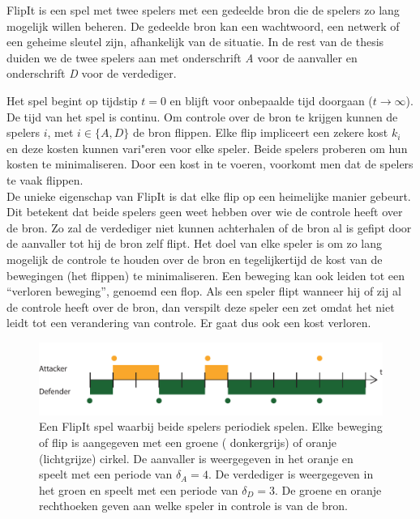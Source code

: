 \documentclass[master=cws, masteroption=vs,english]{kulemt}
\begin{document}
\begin{abstract*}
FlipIt is een spel met twee spelers met een gedeelde bron die de spelers zo lang mogelijk willen beheren. De gedeelde bron kan een wachtwoord, een netwerk of een geheime sleutel zijn, afhankelijk van de situatie. In de rest van de thesis duiden we de twee spelers aan met onderschrift  \textit{A} voor de aanvaller en onderschrift \textit{D} voor de verdediger.

Het spel begint op tijdstip $ t = 0 $ en blijft voor onbepaalde tijd doorgaan ($ t \rightarrow \infty $). De tijd van het spel is continu. Om controle over de bron te krijgen kunnen de spelers $i$, met $ i \in \{A, D \} $ de bron flippen. Elke flip impliceert een zekere kost $ k_{i} $ en deze kosten kunnen vari"eren voor elke speler. Beide spelers proberen om hun kosten te minimaliseren. Door een kost in te voeren, voorkomt men dat de spelers te vaak flippen. \\

De unieke eigenschap van FlipIt is dat elke flip op een heimelijke manier gebeurt. Dit betekent dat beide spelers geen weet hebben over wie de controle heeft over de bron. Zo zal de verdediger niet kunnen achterhalen of de bron al is gefipt door de aanvaller tot hij de bron zelf flipt. Het doel van elke speler is om zo lang mogelijk de controle te houden over de bron en tegelijkertijd de kost van de bewegingen (het flippen) te minimaliseren. Een beweging kan ook leiden tot een ``verloren beweging'', genoemd een flop.  Als een speler flipt wanneer hij of zij al de controle  heeft over de bron, dan verspilt deze speler een zet omdat het niet leidt tot een verandering van controle. Er gaat dus ook een kost verloren. \\


\begin{figure}[hbtp]
\center
\includegraphics[scale=0.7]{../../doc/template/Images/FlipBasic}
\caption{Een FlipIt spel waarbij beide spelers periodiek spelen. Elke beweging of flip is aangegeven met een groene ( donkergrijs) of oranje (lichtgrijze) cirkel. De aanvaller is weergegeven in het oranje en speelt met een periode van $ \delta_{A} = 4 $. De verdediger is weergegeven in het groen en speelt met een periode van $ \delta_{D} = 3 $. De groene en oranje rechthoeken geven aan welke speler in controle is van de bron.}
\label{fig: FLipItDefault}
\end{figure}




\end{abstract*}
\end{document}
